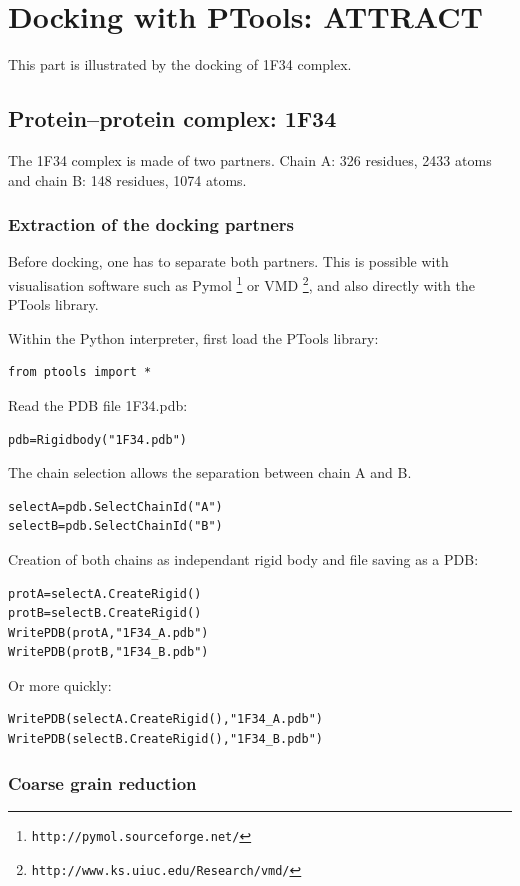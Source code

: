\documentclass[12pt,a4paper]{article}
\begin{document}
\section{Docking with PTools: ATTRACT}

This part is illustrated by the docking of 1F34 complex.

\subsection{Protein--protein complex: 1F34}

The 1F34 complex is made of two partners. Chain A: 326 residues, 2433 atoms and chain B: 148 residues, 1074 atoms.

\subsubsection{Extraction of the docking partners}

Before docking, one has to separate both partners. This is possible with visualisation
software such as Pymol \footnote{\tt http://pymol.sourceforge.net/} or VMD \footnote{\tt http://www.ks.uiuc.edu/Research/vmd/}, 
and also directly with the PTools library.

Within the Python interpreter, first load the PTools library:
\begin{verbatim}
from ptools import *
\end{verbatim}

Read the PDB file 1F34.pdb:
\begin{verbatim}
pdb=Rigidbody("1F34.pdb")
\end{verbatim}

The chain selection allows the separation between chain A and B.
\begin{verbatim}
selectA=pdb.SelectChainId("A")
selectB=pdb.SelectChainId("B")
\end{verbatim}

Creation of both chains as independant rigid body and file saving as a PDB:
\begin{verbatim}
protA=selectA.CreateRigid()
protB=selectB.CreateRigid()
WritePDB(protA,"1F34_A.pdb")
WritePDB(protB,"1F34_B.pdb")
\end{verbatim}
Or more quickly:
\begin{verbatim}
WritePDB(selectA.CreateRigid(),"1F34_A.pdb")
WritePDB(selectB.CreateRigid(),"1F34_B.pdb")
\end{verbatim}

\subsubsection{Coarse grain reduction}
\end{document}
